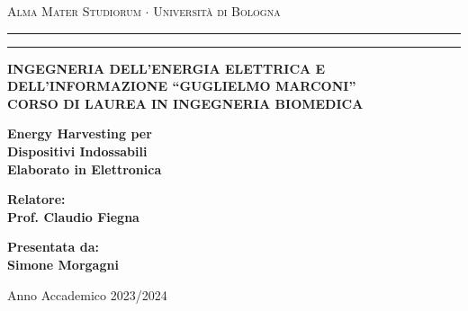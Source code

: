 \documentclass[12pt,a4paper]{extreport}
\begin{document}
\textwidth=450pt
\topmargin=-50pt
\textheight=675pt



\begin{titlepage}
    \topmargin=-50pt
    \begin{center}
    {{\Large{\textsc{Alma Mater Studiorum $\cdot$ Universit\`a di
    Bologna}}}} \rule[0.1cm]{15.8cm}{0.1mm}
    \rule[0.5cm]{15.8cm}{0.6mm}
    {{\bf INGEGNERIA DELL’ENERGIA ELETTRICA E DELL’INFORMAZIONE 
    “GUGLIELMO MARCONI”\\
    \small CORSO DI LAUREA IN INGEGNERIA BIOMEDICA}}
    \end{center}
    \vspace{15mm}
    \begin{center}
    {\LARGE{\bf Energy Harvesting per}}\\
    \vspace{3mm}
    {\LARGE{\bf Dispositivi Indossabili}}\\
    \vspace{2cm}
    {\large{\bf Elaborato in Elettronica}}
    \end{center}
    \vspace{7cm}
    \par
    \noindent
    \begin{minipage}[t]{0.47\textwidth}
    {\large{\bf Relatore:\\
    Prof. Claudio Fiegna}}
    \end{minipage}
    \hfill
    \begin{minipage}[t]{0.47\textwidth}\raggedleft
    {\large{\bf Presentata da:\\
    Simone Morgagni}}
    \end{minipage}
    \vspace{20mm}
    \begin{center}
    {Anno Accademico 2023/2024}
    \end{center}
\end{titlepage}

\tableofcontents
{}






\end{document}
